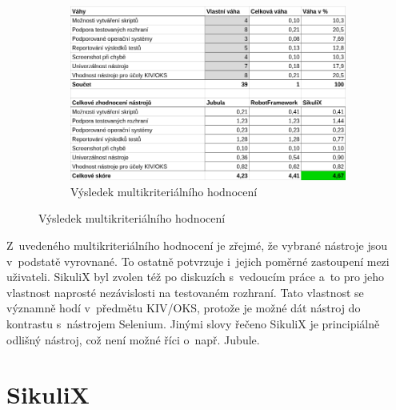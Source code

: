 \documentclass{bakalarka}
\begin{document}
\begin{figure}[ht!]
	\ContinuedFloat
	\begin{subfigure}{\textwidth}
		\centering
		\caption{Výsledek multikriteriálního hodnocení}
		\label{MKVysl}
		\includegraphics[width=14cm]{img/Kriteria/Kriteria3.png}
	\end{subfigure}
\end{figure}

Z~uvedeného multikriteriálního hodnocení je zřejmé, že vybrané nástroje jsou v~podstatě vyrovnané. To ostatně potvrzuje i~jejich poměrné zastoupení mezi uživateli. SikuliX byl zvolen též po diskuzích s~vedoucím práce a~to pro jeho vlastnost naprosté nezávislosti na testovaném rozhraní. Tato vlastnost se významně hodí v~předmětu KIV/OKS, protože je možné dát nástroj do kontrastu s~nástrojem Selenium. Jinými slovy řečeno SikuliX je principiálně odlišný nástroj, což není možné říci o~např. Jubule.

\chapter{SikuliX}
\end{document}
